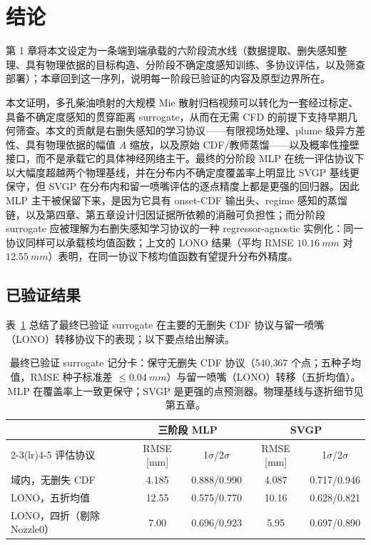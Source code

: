 \section{结论}

第 1 章将本文设定为一条端到端承载的六阶段流水线（数据提取、删失感知整理、具有物理依据的目标构造、分阶段不确定度感知训练、多协议评估，以及筛查部署）；本章回到这一序列，说明每一阶段已验证的内容及原型边界所在。

本文证明，多孔柴油喷射的大规模 Mie 散射归档视频可以转化为一套经过标定、具备不确定度感知的贯穿距离 surrogate，从而在无需 CFD 的前提下支持早期几何筛查。本文的贡献是右删失感知的学习协议——有限视场处理、plume 级异方差性、具有物理依据的幅值 $A$ 缩放，以及原始 CDF/教师蒸馏——以及概率性撞壁接口，而不是承载它的具体神经网络主干。最终的分阶段 MLP 在统一评估协议下以大幅度超越两个物理基线，并在分布内不确定度覆盖率上明显比 SVGP 基线更保守，但 SVGP 在分布内和留一喷嘴评估的逐点精度上都是更强的回归器。因此 MLP 主干被保留下来，是因为它具有 onset-CDF 输出头、regime 感知的蒸馏链，以及第四章、第五章设计归因证据所依赖的消融可负担性；而分阶段 surrogate 应被理解为右删失感知学习协议的一种 regressor-agnostic 实例化：同一协议同样可以承载核均值函数；上文的 LONO 结果（平均 RMSE \(\SI{10.16}{mm}\) 对 \(\SI{12.55}{mm}\)）表明，在同一协议下核均值函数有望提升分布外精度。

\subsection{已验证结果}

表~\ref{tab:conclusions-scorecard-zh} 总结了最终已验证 surrogate 在主要的无删失 CDF 协议与留一喷嘴（LONO）转移协议下的表现；以下要点给出解读。

\begin{table}[h]
\centering
\footnotesize
\setlength{\tabcolsep}{5pt}
\begin{tabular}{lcccc}
\toprule
 & \multicolumn{2}{c}{三阶段 MLP} & \multicolumn{2}{c}{SVGP} \\
\cmidrule(lr){2-3}\cmidrule(lr){4-5}
评估协议 & RMSE [mm] & 1$\sigma$/2$\sigma$ & RMSE [mm] & 1$\sigma$/2$\sigma$ \\
\midrule
域内，无删失 CDF              & 4.185 & 0.888/0.990 & 4.087 & 0.717/0.946 \\
LONO，五折均值               & 12.55 & 0.575/0.770 & 10.16 & 0.628/0.821 \\
LONO，四折（剔除 Nozzle0）   & 7.00  & 0.696/0.923 & 5.95  & 0.697/0.890 \\
\bottomrule
\end{tabular}
\caption{最终已验证 surrogate 记分卡：保守无删失 CDF 协议（540{,}367 个点；五种子均值，RMSE 种子标准差 $\le\SI{0.04}{mm}$）与留一喷嘴（LONO）转移（五折均值）。MLP 在覆盖率上一致更保守；SVGP 是更强的点预测器。物理基线与逐折细节见第五章。}
\label{tab:conclusions-scorecard-zh}
\end{table}

